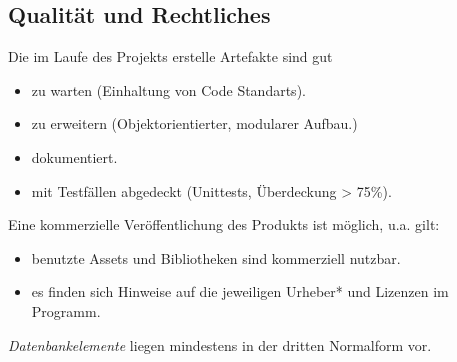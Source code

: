 \subsection{Qualität und Rechtliches}
\begin{requirements}
     Die im Laufe des Projekts erstelle Artefakte sind gut
    \begin{itemize}
        \item zu warten (Einhaltung von Code Standarts).
        \item zu erweitern (Objektorientierter, modularer Aufbau.)
        \item dokumentiert.
        \item mit Testfällen abgedeckt (Unittests, Überdeckung > 75\%).
    \end{itemize}
     Eine kommerzielle Veröffentlichung des Produkts ist möglich, u.a. gilt:
    \begin{itemize}
        \item benutzte Assets und Bibliotheken sind kommerziell nutzbar.
        \item es finden sich Hinweise auf die jeweiligen Urheber* und Lizenzen im Programm.
    \end{itemize}
     \emph{Datenbankelemente} liegen mindestens in der dritten Normalform vor.
\end{requirements}
